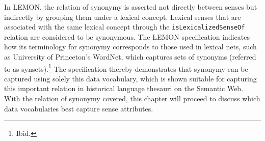 In LEMON, the relation of synonymy is asserted not directly between senses but indirectly by grouping them under a lexical concept. Lexical senses that are associated with the same lexical concept through the \texttt{isLexicalizedSenseOf} relation are considered to be synonymous. 
The LEMON specification indicates how its terminology for synonymy corresponds to those used in lexical nets, such as University of Princeton's WordNet, which captures sets of synonyms (referred to as synsets).\footnote{Ibid.} 
%
%
%
%
The specification thereby demonstrates that synonymy can be captured using solely this data vocabulary, which is shown suitable for capturing this important relation in historical language thesauri on the Semantic Web. 
With the relation of synonymy covered, this chapter will proceed to discuss which data vocabularies best capture sense attributes.

